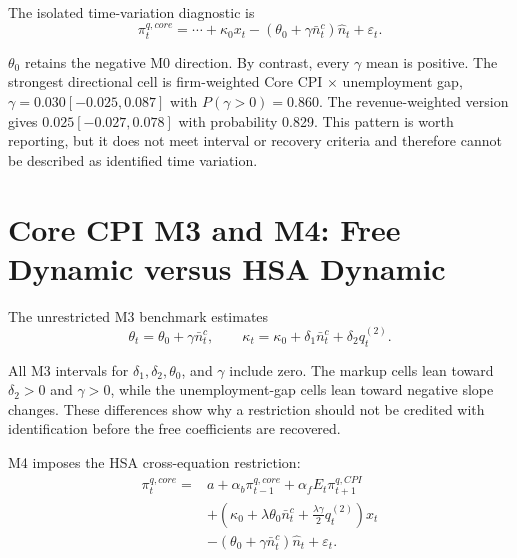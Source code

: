 \documentclass[11pt]{article}
\newcommand{\Nbar}{\bar n}
\newcommand{\Nhat}{\hat n}
\begin{document}
The isolated time-variation diagnostic is
\begin{equation}
\pi_t^{q,core}=\cdots+\kappa_0x_t
-(\theta_0+\gamma\Nbar_t^c)\Nhat_t+\varepsilon_t.
\end{equation}

\begin{table}[H]
\centering
\caption{Core CPI M2 varying-theta model}
\resizebox{\linewidth}{!}{}
\end{table}

$\theta_0$ retains the negative M0 direction. By contrast, every $\gamma$ mean is positive.
The strongest directional cell is firm-weighted Core CPI $\times$ unemployment gap,
$\gamma=0.030[-0.025,0.087]$ with $P(\gamma>0)=0.860$. The revenue-weighted version gives
$0.025[-0.027,0.078]$ with probability 0.829. This pattern is worth reporting, but it does
not meet interval or recovery criteria and therefore cannot be described as identified
time variation.

\section{Core CPI M3 and M4: Free Dynamic versus HSA Dynamic}

The unrestricted M3 benchmark estimates
\begin{equation}
\theta_t=\theta_0+\gamma\Nbar_t^c,\qquad
\kappa_t=\kappa_0+\delta_1\Nbar_t^c+\delta_2q_t^{(2)}.
\end{equation}

\begin{table}[H]
\centering
\caption{Core CPI M3 free-dynamic model}
\resizebox{\linewidth}{!}{}
\end{table}

All M3 intervals for $\delta_1,\delta_2,\theta_0$, and $\gamma$ include zero. The markup
cells lean toward $\delta_2>0$ and $\gamma>0$, while the unemployment-gap cells lean toward
negative slope changes. These differences show why a restriction should not be credited
with identification before the free coefficients are recovered.

M4 imposes the HSA cross-equation restriction:
\begin{align}
\pi_t^{q,core}={}&a+\alpha_b\pi_{t-1}^{q,core}+\alpha_fE_t\pi_{t+1}^{q,CPI}\\
&+\left(\kappa_0+\lambda\theta_0\Nbar_t^c
+\frac{\lambda\gamma}{2}q_t^{(2)}\right)x_t\\
&-(\theta_0+\gamma\Nbar_t^c)\Nhat_t+\varepsilon_t.
\end{align}
\end{document}
